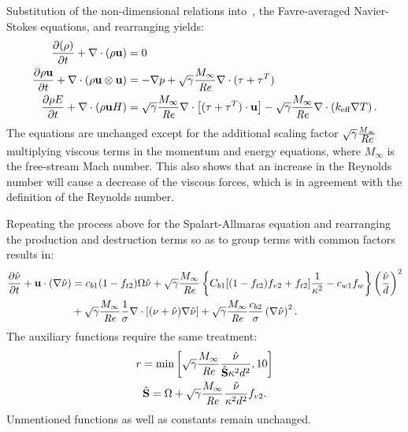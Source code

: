 Substitution of the non-dimensional relations into~, the Favre-averaged Navier-Stokes equations, and rearranging yields:
\begin{align}
      \frac{\partial (\rho )}{\partial t}  + \nabla \cdot (\rho  \mathbf{u})  &= 0 \\
     \frac{\partial \rho\mathbf{u}}{\partial t} 
    + \nabla\cdot(\rho\mathbf{u}\otimes\mathbf{u}) 
    &= -\nabla p + \sqrt{\gamma}\frac{M_\infty}{\mbox{\textit{Re}}}\nabla\cdot(\tau + \tau^T) 
    \\
     \frac{\partial \rho E}{\partial t}  + \nabla\cdot (\rho \mathbf{u} H) &=
        \sqrt{\gamma}\frac{M_\infty}{\mbox{\textit{Re}}}\nabla\cdot \left[ 
            (\tau + \tau^T) \cdot \mathbf{u} 
        \right]
        - \sqrt{\gamma}\frac{M_\infty}{\mbox{\textit{Re}}}\nabla\cdot\left(k_{\text{eff}}\nabla T\right) .
\end{align}
The equations are unchanged except for the additional scaling factor $\sqrt{\gamma}\frac{M_\infty}{\mbox{\textit{Re}}}$ multiplying viscous terms in the momentum and energy equations, where $M_\infty$ is the free-stream Mach number. This also shows that an increase in the Reynolds number will cause a decrease of the viscous forces, which is in agreement with the definition of the Reynolds number.

Repeating the process above for the Spalart-Allmaras equation and rearranging the production and destruction terms so as to group terms with common factors results in:
\begin{align}
\begin{split}
    \pdiff{\sa}{t} + \vec{u}\cdot(\nabla\sa) &= 
        c_{b1}(1 - f_{t2})\Omega\sa
        + \ndim \left\{ 
            C_{b1}[(1 - f_{t2})f_{v2} + f_{t2}]\frac{1}{\kappa^2} - c_{w1}f_w
        \right\} \left(\frac{\sa}{d}\right)^2
        \\
        &+ \ndim \frac{1}{\sigma}\nabla\cdot\left[ (\nu + \sa) \nabla\sa \right]
        + \ndim \frac{c_{b2}}{\sigma}\left(\nabla \sa\right)^2.
\end{split}
\label{eq:synsa}
\end{align}
The auxiliary functions require the same treatment:
\begin{gather*}
    r = \text{min} \left[ 
        \ndim \frac{\sa}{\hat{S}\kappa^2 d^2}, 10
    \right] \\
    \hat{S} = \Omega + \ndim \frac{\sa}{\kappa^2 d^2} f_{v2}.
\end{gather*}
Unmentioned functions as well as constants remain unchanged.
\label{sec:synnondim}
%

